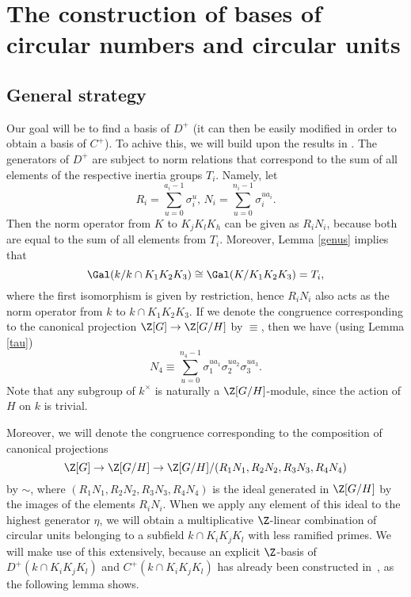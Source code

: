 \chapter{The construction of bases of circular numbers and circular units}

\section{General strategy}
Our goal will be to find a basis of $D^+$ (it can then be easily modified in order to obtain a basis of $C^+$). To achive this, we will build upon the results in \citep{Kucera2016}. The generators of $D^+$ are subject to norm relations that correspond to the sum of all elements of the respective inertia groups $T_i$. Namely, let $$R_i=\sum_{u=0}^{a_i-1}\sigma_i^u,\, N_i=\sum_{u=0}^{n_i-1}\sigma_i^{ua_i}.$$ 
Then the norm operator from $K$ to $K_jK_lK_h$ can be given as $R_iN_i$, because both are equal to the sum of all elements from $T_i$. Moreover, Lemma \ref{genus} implies that $$\Gal(k/k\cap K_1K_2K_3)\cong \Gal(K/ K_1K_2K_3)=T_i,$$
where the first isomorphism is given by restriction, hence $R_iN_i$ also acts as the norm operator from $k$ to $k\cap K_1K_2K_3$.
If we denote the congruence corresponding to the canonical projection $\Z[G]\to \Z[G/H]$ by $\equiv$, then we have (using Lemma \ref{tau}) $$N_4\equiv \sum_{u=0}^{n_4-1}\sigma_1^{ua_1}\sigma_2^{ua_2}\sigma_3^{ua_3}.$$ Note that any subgroup of $k^{\times}$ is naturally a $\Z[G/H]$-module, since the action of $H$ on $k$ is trivial.

Moreover, we will denote the congruence corresponding to the composition of canonical projections $$\Z[G]\to \Z[G/H]\to \Z[G/H]/(R_1N_1,R_2N_2,R_3N_3,R_4N_4)$$ by $\sim$, where $(R_1N_1,R_2N_2,R_3N_3,R_4N_4)$ is the ideal generated in $\Z[G/H]$ by the images of the elements $R_iN_i$. When we apply any element of this ideal to the highest generator $\eta$, we will obtain a multiplicative $\Z$-linear combination of circular units belonging to a subfield $k\cap K_iK_jK_l$ with less ramified primes. We will make use of this extensively, because an explicit $\Z$-basis of $D^+(k\cap K_iK_jK_l)$ and $C^+(k\cap K_iK_jK_l)$ has already been constructed in~\citep{Kucera2016}, as the following lemma shows.

